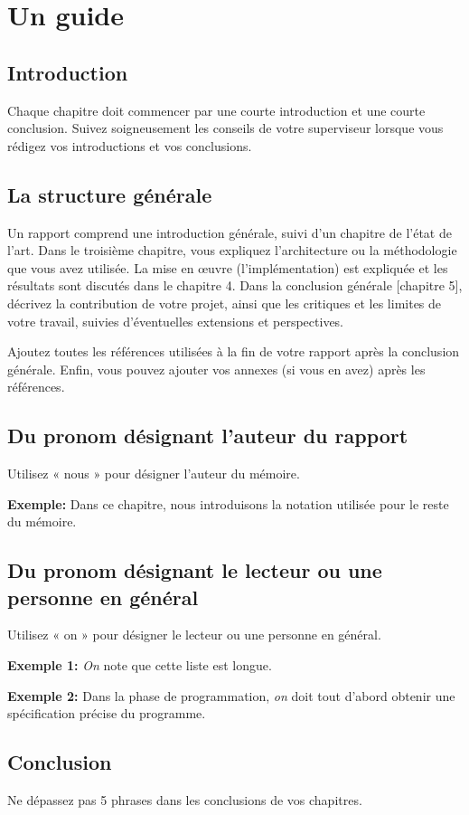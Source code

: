 \chapter{Un guide}

\section{Introduction}
Chaque chapitre doit commencer par une courte introduction et une courte conclusion. Suivez soigneusement les conseils de votre superviseur lorsque vous rédigez vos introductions et vos conclusions. 

\section{La structure générale}
Un rapport comprend une introduction générale, suivi d'un chapitre de l’état de l'art. Dans le troisième chapitre, vous expliquez l'architecture ou la méthodologie que vous avez utilisée. La mise en œuvre (l’implémentation) est expliquée et les résultats sont discutés dans le chapitre 4. Dans la conclusion générale [chapitre 5], décrivez la contribution de votre projet, ainsi que les critiques et les limites de votre travail, suivies d'éventuelles extensions et perspectives.

Ajoutez toutes les références utilisées à la fin de votre rapport après la conclusion générale. Enfin, vous pouvez ajouter vos annexes (si vous en avez) après les références.



\section{Du pronom désignant l'auteur du rapport}
Utilisez « nous » pour désigner l'auteur du mémoire.

\textbf{Exemple:} Dans ce chapitre, nous introduisons la notation utilisée pour le reste du mémoire.

\section{Du pronom désignant le lecteur ou une personne en général}
Utilisez « on » pour désigner le lecteur ou une personne en général.

\textbf{Exemple 1:} \textit{On} note que cette liste est longue.

\textbf{Exemple 2:} Dans la phase de programmation, \textit{on} doit tout d'abord obtenir une spécification précise du programme.

\section{Conclusion}
Ne dépassez pas 5 phrases dans les conclusions de vos chapitres. 